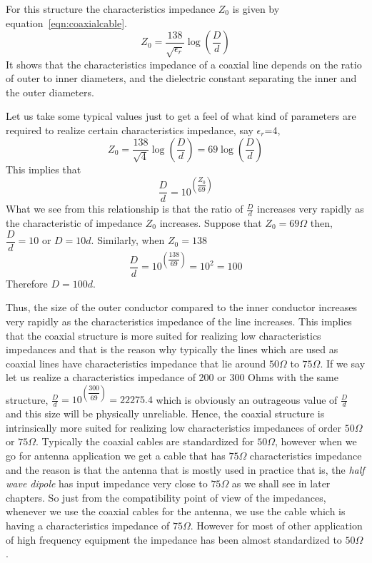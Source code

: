 For this structure the characteristics impedance $Z_0$ is given by equation~\eqref{eqn:coaxialcable}.
\begin{equation}
Z_0 =\frac{138}{\sqrt{\epsilon_r}}\log(\dfrac{D}{d})
\label{eqn:coaxialcable}
\end{equation}
It shows that the characteristics impedance of a coaxial line depends on the ratio of outer to inner diameters, and the dielectric constant separating the inner and the outer diameters.

Let us take some typical values just to get a feel of what kind of parameters are required to realize certain characteristics impedance, say $\epsilon_r$=4, 
\begin{dmath*}
Z_0 =\dfrac{138}{\sqrt{4}}\log(\dfrac{D}{d})
= 69\log(\dfrac{D}{d})
\end{dmath*}
This implies that
\begin{dmath*}
\frac{D}{d}=10^{\left(\dfrac{Z_0 }{69}\right)}
\end{dmath*}
What we see from this relationship is that the ratio of $\frac{D}{d}$ increases very rapidly as the characteristic of impedance $Z_0 $ increases. Suppose that $Z_0 = 69\varOmega$ then, $\dfrac{D}{d}= 10$ or $D=10d$. Similarly, when $Z_0 = 138$
\begin{dmath*}
\dfrac{D}{d}=10^{\left(\dfrac{138}{69}\right)}=10^{2}=100
\end{dmath*}
Therefore $D=100d$.

Thus, the size of the outer conductor compared to the inner conductor increases very rapidly as the characteristics impedance of the line increases. This implies that the coaxial structure is more suited for realizing low characteristics impedances and that is the reason why typically the lines which are used as coaxial lines have characteristics impedance that lie around $50\varOmega$ to $75\varOmega$. If we say let us realize a characteristics impedance of 200 or 300 Ohms with the same structure, $\frac{D}{d} = 10^{\left(\dfrac{300}{69}\right)} = 22275.4$ which is obviously an outrageous value of $\frac{D}{d}$ and this size will be physically unreliable. Hence, the coaxial structure is intrinsically more suited for realizing low characteristics impedances of order $50\varOmega$ or $75\varOmega$. Typically the coaxial cables are standardized for $50\varOmega$, however when we go for antenna application we get a cable that has $75\varOmega$ characteristics impedance and the reason is that the antenna that is mostly used in practice that is, the \emph{half wave dipole} has input impedance very close to $75\varOmega$ as we shall see in later chapters. So just from the compatibility point of view of the impedances, whenever we use the coaxial cables for the antenna, we use the cable which is having a characteristics impedance of $75\varOmega$. However for most of other application of high frequency equipment the impedance has been almost standardized to $50\varOmega$.

